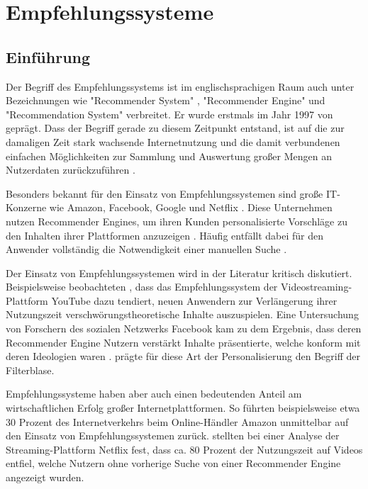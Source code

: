 
\chapter{Empfehlungssysteme}
\label{ch:empfehlungssysteme}

\section{Einführung}
\label{ch:empfehlungssysteme:einfuehrung}
Der Begriff des Empfehlungssystems ist im englischsprachigen Raum auch unter Bezeichnungen wie "Recommender System" \cite[S. 1]{lu:2015}, "Recommender Engine" \cite[S. 1]{panigrahi:2016} und "Recommendation System" \cite[S. 1]{ebesu:2018} verbreitet. Er wurde erstmals im Jahr 1997 von \textcite[S. 1]{resnick:1997} geprägt. Dass der Begriff gerade zu diesem Zeitpunkt entstand, ist auf die zur damaligen Zeit stark wachsende Internetnutzung und die damit verbundenen einfachen Möglichkeiten zur Sammlung und Auswertung großer Mengen an Nutzerdaten zurückzuführen \cite[S. xvii]{recommenderSystems:2016}.

Besonders bekannt für den Einsatz von Empfehlungssystemen sind große IT-Konzerne wie Amazon, Facebook, Google und Netflix \cite[S. 1]{zarzour:2018}. Diese Unternehmen nutzen Recommender Engines, um ihren Kunden personalisierte Vorschläge zu den Inhalten ihrer Plattformen anzuzeigen \cite[S. 2]{jeckmans:2013}. Häufig entfällt dabei für den Anwender vollständig die Notwendigkeit einer manuellen Suche \cite[S. 1]{comibingCareer:2013}.

Der Einsatz von Empfehlungssystemen wird in der Literatur kritisch diskutiert. Beispielsweise beobachteten \textcite[S. 17f.]{alfano:2020}, dass das Empfehlungssystem der Videostreaming-Plattform YouTube dazu tendiert, neuen Anwendern zur Verlängerung ihrer Nutzungszeit verschwörungstheoretische Inhalte auszuspielen. Eine Untersuchung von Forschern des sozialen Netzwerks Facebook kam zu dem Ergebnis, dass deren Recommender Engine Nutzern verstärkt Inhalte präsentierte, welche konform mit deren Ideologien waren \cite[S. 2]{bakshy:2015}. \textcite[S. 1ff.]{pariser:2012} prägte für diese Art der Personalisierung den Begriff der Filterblase.

Empfehlungssysteme haben aber auch einen bedeutenden Anteil am wirtschaftlichen Erfolg großer Internetplattformen. So führten beispielsweise \textcite[S. 6f.]{sharma:2015} etwa 30 Prozent des Internetverkehrs beim Online-Händler Amazon unmittelbar auf den Einsatz von Empfehlungssystemen zurück. \textcite[S. 5]{gomezuribe:2016} stellten bei einer Analyse der Streaming-Plattform Netflix fest, dass ca. 80 Prozent der Nutzungszeit auf Videos entfiel, welche Nutzern ohne vorherige Suche von einer Recommender Engine angezeigt wurden.

